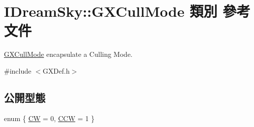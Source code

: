 \hypertarget{class_i_dream_sky_1_1_g_x_cull_mode}{}\section{I\+Dream\+Sky\+:\+:G\+X\+Cull\+Mode 類別 參考文件}
\label{class_i_dream_sky_1_1_g_x_cull_mode}


\hyperlink{class_i_dream_sky_1_1_g_x_cull_mode}{G\+X\+Cull\+Mode} encapsulate a Culling Mode.  




{\ttfamily \#include $<$G\+X\+Def.\+h$>$}

\subsection*{公開型態}
\begin{DoxyCompactItemize}
\item 
enum \{ \hyperlink{class_i_dream_sky_1_1_g_x_cull_mode_a53fb9da080190bd0117091a96b82e0eea4a93ec35267d974dc03aaf02974cc306}{CW} = 0, 
\hyperlink{class_i_dream_sky_1_1_g_x_cull_mode_a53fb9da080190bd0117091a96b82e0eea0e7f7609700d64eba250f44ddf5358b8}{C\+CW} = 1
 \}
\end{DoxyCompactItemize}
